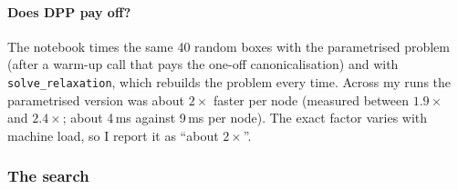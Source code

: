\documentclass[11pt,a4paper]{article}
\begin{document}
\paragraph{Does DPP pay off?} The notebook times the same 40 random boxes with the parametrised problem (after a warm-up call that pays the one-off canonicalisation) and with \texttt{solve\_relaxation}, which rebuilds the problem every time. Across my runs the parametrised version was about $2\times$ faster per node (measured between $1.9\times$ and $2.4\times$; about 4\,ms against 9\,ms per node). The exact factor varies with machine load, so I report it as ``about $2\times$''.

\subsubsection{The search}
\end{document}
